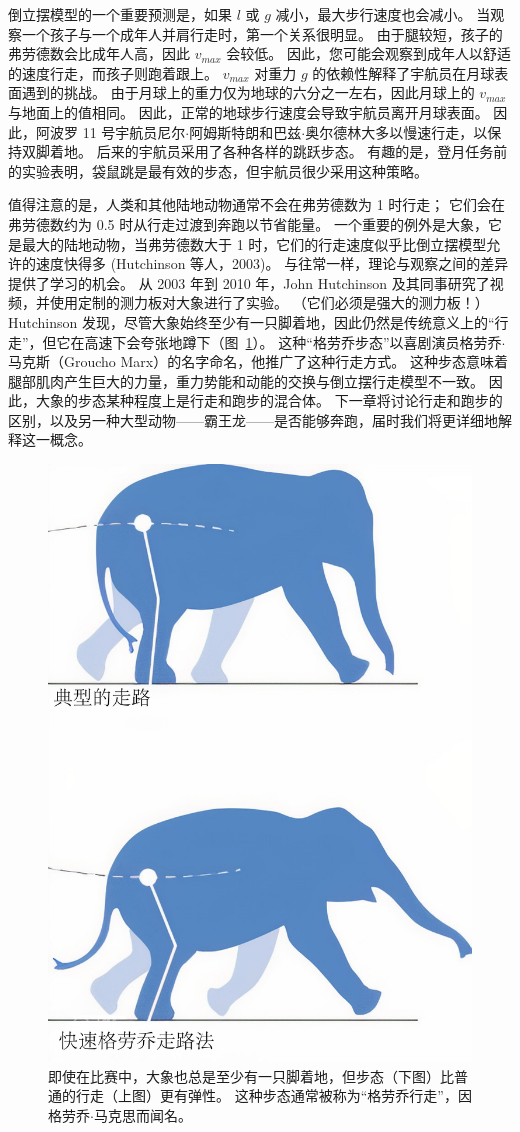 倒立摆模型的一个重要预测是，如果 $l$ 或 $g$ 减小，最大步行速度也会减小。
当观察一个孩子与一个成年人并肩行走时，第一个关系很明显。
由于腿较短，孩子的弗劳德数会比成年人高，因此 $v_{max}$ 会较低。
因此，您可能会观察到成年人以舒适的速度行走，而孩子则跑着跟上。 
$v_{max}$ 对重力 $g$ 的依赖性解释了宇航员在月球表面遇到的挑战。
由于月球上的重力仅为地球的六分之一左右，因此月球上的 $v_{max}$ 与地面上的值相同。
因此，正常的地球步行速度会导致宇航员离开月球表面。
因此，阿波罗 11 号宇航员尼尔$\cdot$阿姆斯特朗和巴兹$\cdot$奥尔德林大多以慢速行走，以保持双脚着地。
后来的宇航员采用了各种各样的跳跃步态。
有趣的是，登月任务前的实验表明，袋鼠跳是最有效的步态，但宇航员很少采用这种策略。



值得注意的是，人类和其他陆地动物通常不会在弗劳德数为 1 时行走；
它们会在弗劳德数约为 0.5 时从行走过渡到奔跑以节省能量。
一个重要的例外是大象，它是最大的陆地动物，当弗劳德数大于 1 时，它们的行走速度似乎比倒立摆模型允许的速度快得多 (Hutchinson 等人，2003)。
与往常一样，理论与观察之间的差异提供了学习的机会。
从 2003 年到 2010 年，John Hutchinson 及其同事研究了视频，并使用定制的测力板对大象进行了实验。
（它们必须是强大的测力板！）
Hutchinson 发现，尽管大象始终至少有一只脚着地，因此仍然是传统意义上的“行走”，但它在高速下会夸张地蹲下（图~\ref{fig:2_10}）。
这种“格劳乔步态”以喜剧演员格劳乔$\cdot$马克斯（Groucho Marx）的名字命名，他推广了这种行走方式。
这种步态意味着腿部肌肉产生巨大的力量，重力势能和动能的交换与倒立摆行走模型不一致。
因此，大象的步态某种程度上是行走和跑步的混合体。
下一章将讨论行走和跑步的区别，以及另一种大型动物——霸王龙——是否能够奔跑，届时我们将更详细地解释这一概念。

\begin{figure}[!htb]
	\centering
	\includegraphics[width=0.4\linewidth]{chap2/2_10}
	\caption{即使在比赛中，大象也总是至少有一只脚着地，但步态（下图）比普通的行走（上图）更有弹性。
		这种步态通常被称为“格劳乔行走”，因格劳乔$\cdot$马克思而闻名。 \label{fig:2_10}}
\end{figure}


